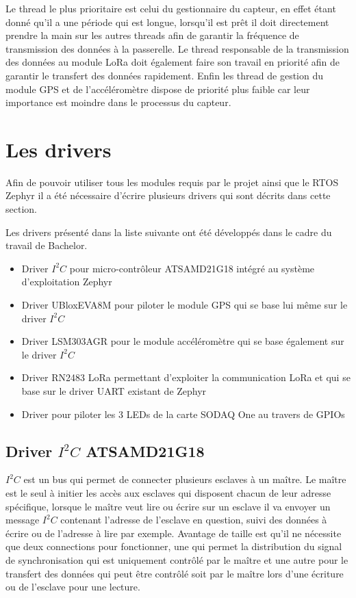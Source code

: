 Le thread le plus prioritaire est celui du gestionnaire du capteur, en effet étant donné qu'il a une période qui est longue, lorsqu'il est prêt il doit directement prendre la main sur les autres threads afin de garantir la fréquence de transmission des données à la passerelle.
Le thread responsable de la transmission des données au module LoRa doit également faire son travail en priorité afin de garantir le transfert des données rapidement.
Enfin les thread de gestion du module GPS et de l'accéléromètre dispose de priorité plus faible car leur importance est moindre dans le processus du capteur.

\section{Les drivers}\label{ch:drivers}

Afin de pouvoir utiliser tous les modules requis par le projet ainsi que le RTOS Zephyr il a été nécessaire d'écrire plusieurs drivers qui sont décrits dans cette section.

Les drivers présenté dans la liste suivante ont été développés dans le cadre du travail de Bachelor.

\begin{itemize}
\item Driver $I^{2}C$ pour micro-contrôleur ATSAMD21G18 intégré au système d'exploitation Zephyr
\item Driver UBloxEVA8M pour piloter le module GPS qui se base lui même sur le driver $I^{2}C$
\item Driver LSM303AGR pour le module accéléromètre qui se base également sur le driver  $I^{2}C$
\item Driver RN2483 LoRa permettant d'exploiter la communication LoRa et qui se base sur le driver UART existant de Zephyr
\item Driver pour piloter les 3 LEDs de la carte SODAQ One au travers de GPIOs
\end{itemize}

\subsection{Driver $I^{2}C$ ATSAMD21G18}

$I^{2}C$ est un bus qui permet de connecter plusieurs esclaves à un maître. Le maître est le seul à initier les accès aux esclaves qui disposent chacun de leur adresse spécifique, lorsque le maître veut lire ou écrire sur un esclave il va envoyer un message $I^{2}C$ contenant l'adresse de l'esclave en question, suivi des données à écrire ou de l'adresse à lire par exemple. Avantage de taille est qu'il ne nécessite que deux connections pour fonctionner, une qui permet la distribution du signal de synchronisation qui est uniquement contrôlé par le maître et une autre pour le transfert des données qui peut être contrôlé soit par le maître lors d'une écriture ou de l'esclave pour une lecture.


